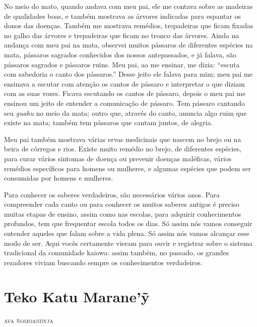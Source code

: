 No meio do mato, quando andava com meu pai, ele me contava sobre as
madeiras de qualidades boas, e também mostrava as árvores indicadas para
espantar os donos das doenças. Também me mostrava remédios, trepadeiras
que ficam fixadas no galho das árvores e trepadeiras que ficam no tronco
das árvores. Ainda na andança com meu pai na mata, observei muitos
pássaros de diferentes espécies na mata, pássaros sagrados conhecidos
dos nossos antepassados, e já falava, são pássaros sagrados e pássaros
ruins. Meu pai, ao me ensinar, me dizia: ``escuta com sabedoria o canto
dos pássaros.'' Desse jeito ele falava para mim; meu pai me ensinava a
escutar com atenção os cantos de pássaro e interpretar o que diziam com
as suas vozes. Ficava escutando os cantos de pássaro, depois o meu pai
me ensinou um jeito de entender a comunicação de pássaro. Tem pássaro
cantando seu \emph{guahu} no meio da mata; outro que, através do canto,
anuncia algo ruim que existe na mata; também tem pássaros que cantam
juntos, de alegria.

Meu pai também mostrava várias ervas medicinais que nascem no brejo ou
na beira de córregos e rios. Existe muito remédio no brejo, de
diferentes espécies, para curar vários sintomas de doença ou prevenir
doenças maléficas, vários remédios específicos para homens ou mulheres,
e algumas espécies que podem ser consumidas por homens e mulheres.

Para conhecer os saberes verdadeiros, são necessários vários anos. Para
compreender cada canto ou para conhecer os muitos saberes antigos é
preciso muitas etapas de ensino, assim como nas escolas, para adquirir
conhecimentos profundos, tem que frequentar escola todos os dias. Só
assim nós vamos conseguir entender aqueles que falam sobre a vida plena.
Só assim nós vamos alcançar esse modo de ser. Aqui vocês certamente
vieram para ouvir e registrar sobre o sistema tradicional da comunidade
kaiowa: assim também, no passado, os grandes rezadores viviam buscando
sempre os conhecimentos verdadeiros.

\chapter*{Teko Katu Marane'ỹ}

\begin{flushright}
\textsc{ava ñomoandyja}
\end{flushright}

